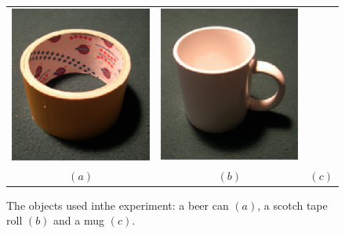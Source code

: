 \begin{figure}[htbp]
\begin{center}
\begin{tabular}{ccc}
      \includegraphics[height=0.2\textheight]{scotch.eps}  &
      \includegraphics[height=0.2\textheight]{mug.eps} \\
      $(a)$ & $(b)$ & $(c)$
    \end{tabular}
    \caption{The objects used inthe experiment: a beer can $(a)$, a scotch
    tape roll $(b)$ and a mug $(c)$.}
    \label{fig:objects}
  \end{center}
\end{figure}


